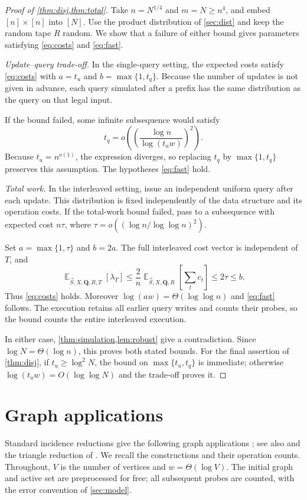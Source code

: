 \documentclass[11pt]{article}
\theoremstyle{plain}
\newcommand{\E}{\mathop{\mathbb{E}}}
\newcommand{\vS}{\vec{S}}
\begin{document}
\begin{proof}[Proof of \cref{thm:disj,thm:total}]
Take $n=N^{1/4}$ and $m=N\ge n^4$, and embed
$[n]\times[n]$ into $[N]$. Use the product distribution of
\cref{sec:dist} and keep the random tape $R$ random.
We show that a failure of either bound gives parameters satisfying
\eqref{eq:costs} and \eqref{eq:fast}.

\emph{Update--query trade-off.}
In the single-query setting, the expected costs satisfy \eqref{eq:costs}
with $a=t_u$ and $b=\max\{1,t_q\}$.
Because the number of updates is not given in advance, each query
simulated after a prefix has the same distribution as the query on
that legal input.

If the bound failed, some infinite subsequence would satisfy
\[
 t_q=o\!\left(\left(\frac{\log n}{\log(t_uw)}\right)^2\right).
\]
Because $t_u=n^{o(1)}$,
the expression diverges, so replacing $t_q$ by $\max\{1,t_q\}$
preserves this assumption. The hypotheses \eqref{eq:fast} hold.

\emph{Total work.}
In the interleaved setting, issue an independent uniform query after
each update. This distribution is
fixed independently of the data structure and its operation costs.
If the total-work bound failed, pass to a subsequence with expected
cost $n\tau$, where $\tau=o((\log n/\log\log n)^2)$.

Set $a=\max\{1,\tau\}$ and $b=2a$.
The full interleaved cost vector is independent of $T$, and
\[
 \E_{\vS,X,\mathbf Q,R,T}[\lambda_T]
 \le\frac2n\E_{\vS,X,\mathbf Q,R}\!\left[\sum_t c_t\right]
 \le2\tau\le b.
\]
Thus \eqref{eq:costs} holds. Moreover
$\log(aw)=\Theta(\log\log n)$ and \eqref{eq:fast} follows.
The execution retains all earlier query writes and counts their
probes, so the bound counts the entire interleaved execution.

In either case, \cref{thm:simulation,lem:robust} give a contradiction.
Since $\log N=\Theta(\log n)$, this proves both stated bounds.
For the final assertion of \cref{thm:disj}, if $t_u\ge\log^2 N$,
the bound on $\max\{t_u,t_q\}$ is immediate; otherwise
$\log(t_uw)=O(\log\log N)$ and the trade-off proves it.
\end{proof}

\section{Graph applications}\label{sec:applications}

Standard incidence reductions give the following graph applications
\cite[Appendix~A]{patrascu_mihai_towards_2010}; see also
\cite{ko_omegalog_2026} and the triangle reduction of
\cite[Lemma~3.3]{henzinger_unifying_2015}.
We recall the constructions and their operation counts.
Throughout, $V$ is the number of vertices and $w=\Theta(\log V)$.
The initial graph and active set are preprocessed for free; all subsequent
probes are counted, with the error convention of \cref{sec:model}.
\end{document}
